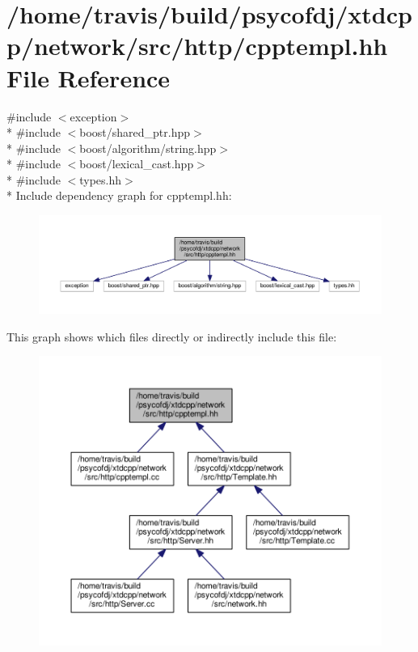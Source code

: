 \hypertarget{cpptempl_8hh}{\section{/home/travis/build/psycofdj/xtdcpp/network/src/http/cpptempl.hh File Reference}
\label{cpptempl_8hh}
}
{\ttfamily \#include $<$exception$>$}\\*
{\ttfamily \#include $<$boost/shared\-\_\-ptr.\-hpp$>$}\\*
{\ttfamily \#include $<$boost/algorithm/string.\-hpp$>$}\\*
{\ttfamily \#include $<$boost/lexical\-\_\-cast.\-hpp$>$}\\*
{\ttfamily \#include $<$types.\-hh$>$}\\*
Include dependency graph for cpptempl.\-hh\-:
\nopagebreak
\begin{figure}[H]
\begin{center}
\leavevmode
\includegraphics[width=350pt]{cpptempl_8hh__incl}
\end{center}
\end{figure}
This graph shows which files directly or indirectly include this file\-:
\nopagebreak
\begin{figure}[H]
\begin{center}
\leavevmode
\includegraphics[width=350pt]{cpptempl_8hh__dep__incl}
\end{center}
\end{figure}
